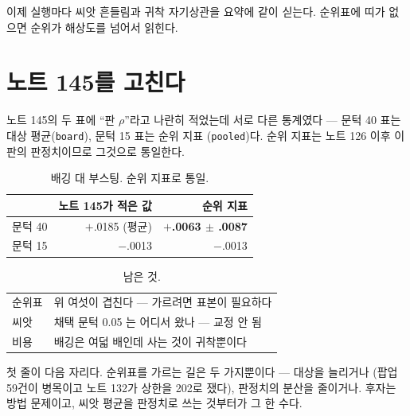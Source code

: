 \documentclass[10pt]{article}
\begin{document}

이제 실행마다 씨앗 흔들림과 귀착 자기상관을 요약에 같이 싣는다. 순위표에
띠가 없으면 순위가 해상도를 넘어서 읽힌다.

\section{노트 145를 고친다}

노트 145의 두 표에 ``판 $\rho$''라고 나란히 적었는데 서로 다른 통계였다 ---
문턱 40 표는 대상 평균(\texttt{board}), 문턱 15 표는 순위 지표
(\texttt{pooled})다. 순위 지표는 노트 126 이후 이 판의 판정치이므로 그것으로
통일한다.

\begin{table}[t]
\centering\tsize
\caption{배깅 대 부스팅. 순위 지표로 통일.}
\begin{tabular}{lrr}
\toprule
& 노트 145가 적은 값 & \textbf{순위 지표} \\
\midrule
문턱 40 & $+$.0185 (평균) & \textbf{$+$.0063 $\pm$ .0087} \\
문턱 15 & $-$.0013 & $-$.0013 \\
\bottomrule
\end{tabular}
\end{table}


\begin{table}[t]
\centering\tsize
\caption{남은 것.}
\begin{tabular}{ll}
\toprule
순위표 & 위 여섯이 겹친다 --- 가르려면 표본이 필요하다 \\
씨앗 & 채택 문턱 0.05 는 어디서 왔나 --- 교정 안 됨 \\
비용 & 배깅은 여덟 배인데 사는 것이 귀착뿐이다 \\
\bottomrule
\end{tabular}
\end{table}

첫 줄이 다음 자리다. 순위표를 가르는 길은 두 가지뿐이다 --- 대상을 늘리거나
(팝업 59건이 병목이고 노트 132가 상한을 202로 쟀다), 판정치의 분산을 줄이거나.
후자는 방법 문제이고, 씨앗 평균을 판정치로 쓰는 것부터가 그 한 수다.
\end{document}
